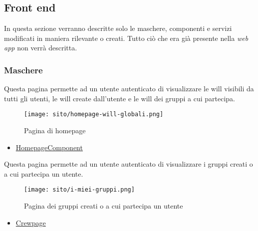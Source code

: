 \subsection{Front end}
In questa sezione verranno descritte solo le maschere, componenti e servizi modificati in maniera rilevante o creati. Tutto ciò che era già presente nella \textit{web app} non verrà descritta.
\subsubsection{Maschere}
Questa pagina permette ad un utente autenticato di visualizzare le \gls{will} visibili da tutti gli utenti, le \gls{will} create dall'utente e le \gls{will} dei gruppi a cui partecipa.
\begin{figure}[H] 
    \centering 
    \texttt{[image: sito/homepage-will-globali.png]} 
    \caption{Pagina di homepage}
\end{figure}
\begin{itemize}
    \item \hyperref[par:HomepageComponent]{HomepageComponent}
\end{itemize}

\label{par:Gruppi dell'utente}
Questa pagina permette ad un utente autenticato di visualizzare i gruppi creati o a cui partecipa un utente. 
\begin{figure}[H] 
    \centering 
    \texttt{[image: sito/i-miei-gruppi.png]} 
    \caption{Pagina dei gruppi creati o a cui partecipa un utente}
\end{figure}
\begin{itemize}
    \item \hyperref[par:Crewpage]{Crewpage}
\end{itemize}


